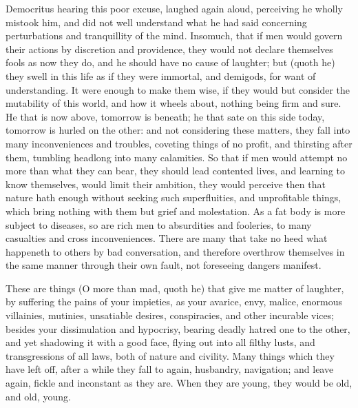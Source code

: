 {Democritus hearing this poor excuse, laughed again aloud, perceiving he
wholly mistook him, and did not well understand what he had said
concerning perturbations and tranquillity of the mind. Insomuch, that
if men would govern their actions by discretion and providence, they
would not declare themselves fools as now they do, and he should have
no cause of laughter; but (quoth he) they swell in this life as if they
were immortal, and demigods, for want of understanding. It were enough
to make them wise, if they would but consider the mutability of this
world, and how it wheels about, nothing being firm and sure. He that is
now above, tomorrow is beneath; he that sate on this side today,
tomorrow is hurled on the other: and not considering these matters,
they fall into many inconveniences and troubles, coveting things of no
profit, and thirsting after them, tumbling headlong into many
calamities. So that if men would attempt no more than what they can
bear, they should lead contented lives, and learning to know
themselves, would limit their ambition, they would perceive then
that nature hath enough without seeking such superfluities, and
unprofitable things, which bring nothing with them but grief and
molestation. As a fat body is more subject to diseases, so are rich men
to absurdities and fooleries, to many casualties and cross
inconveniences. There are many that take no heed what happeneth to
others by bad conversation, and therefore overthrow themselves in the
same manner through their own fault, not foreseeing dangers manifest.

These are things (O more than mad, quoth he) that give me matter of
laughter, by suffering the pains of your impieties, as your avarice,
envy, malice, enormous villainies, mutinies, unsatiable desires,
conspiracies, and other incurable vices; besides your
dissimulation and hypocrisy, bearing deadly hatred one to the
other, and yet shadowing it with a good face, flying out into all
filthy lusts, and transgressions of all laws, both of nature and
civility. Many things which they have left off, after a while they fall
to again, husbandry, navigation; and leave again, fickle and inconstant
as they are. When they are young, they would be old, and old, young.

}
